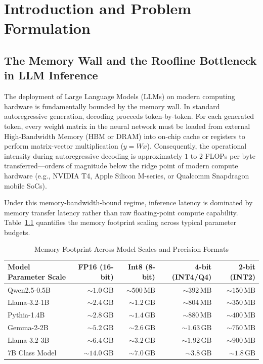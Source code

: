 \documentclass[12pt,a4paper,oneside]{report}
\begin{document}
\newpage
\tableofcontents
\newpage
\listoffigures
\newpage
\listoftables
\newpage

\chapter{Introduction and Problem Formulation}

\section{The Memory Wall and the Roofline Bottleneck in LLM Inference}
The deployment of Large Language Models (LLMs) on modern computing hardware is fundamentally bounded by the memory wall. In standard autoregressive generation, decoding proceeds token-by-token. For each generated token, every weight matrix in the neural network must be loaded from external High-Bandwidth Memory (HBM or DRAM) into on-chip cache or registers to perform matrix-vector multiplication ($y = W x$). Consequently, the operational intensity during autoregressive decoding is approximately $1$ to $2$ FLOPs per byte transferred—orders of magnitude below the ridge point of modern compute hardware (e.g., NVIDIA T4, Apple Silicon M-series, or Qualcomm Snapdragon mobile SoCs). 

Under this memory-bandwidth-bound regime, inference latency is dominated by memory transfer latency rather than raw floating-point compute capability. Table~\ref{tab:memory_footprints} quantifies the memory footprint scaling across typical parameter budgets.

\begin{table}[h!]
\centering
\caption{Memory Footprint Across Model Scales and Precision Formats}
\label{tab:memory_footprints}
\renewcommand{\arraystretch}{1.2}
\begin{tabular}{lrrrr}
\toprule
\textbf{Model Parameter Scale} & \textbf{FP16 (16-bit)} & \textbf{Int8 (8-bit)} & \textbf{4-bit (INT4/Q4)} & \textbf{2-bit (INT2)} \\
\midrule
Qwen2.5-0.5B & $\sim 1.0\,\text{GB}$ & $\sim 500\,\text{MB}$ & $\sim 392\,\text{MB}$ & $\sim 150\,\text{MB}$ \\
Llama-3.2-1B & $\sim 2.4\,\text{GB}$ & $\sim 1.2\,\text{GB}$ & $\sim 804\,\text{MB}$ & $\sim 350\,\text{MB}$ \\
Pythia-1.4B & $\sim 2.8\,\text{GB}$ & $\sim 1.4\,\text{GB}$ & $\sim 880\,\text{MB}$ & $\sim 400\,\text{MB}$ \\
Gemma-2-2B & $\sim 5.2\,\text{GB}$ & $\sim 2.6\,\text{GB}$ & $\sim 1.63\,\text{GB}$ & $\sim 750\,\text{MB}$ \\
Llama-3.2-3B & $\sim 6.4\,\text{GB}$ & $\sim 3.2\,\text{GB}$ & $\sim 1.92\,\text{GB}$ & $\sim 900\,\text{MB}$ \\
7B Class Model & $\sim 14.0\,\text{GB}$ & $\sim 7.0\,\text{GB}$ & $\sim 3.8\,\text{GB}$ & $\sim 1.8\,\text{GB}$ \\
\bottomrule
\end{tabular}
\end{table}
\end{document}
